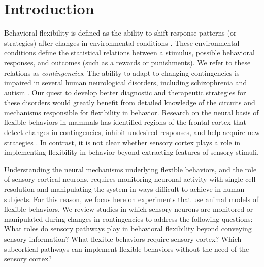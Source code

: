\section{Introduction}
Behavioral flexibility is defined as the ability to shift response patterns (or strategies) after changes in environmental conditions \citep{Ragozzino2007}. These environmental conditions define the statistical relations between a stimulus, possible behavioral responses, and outcomes (such as a rewards or punishments). We refer to these relations as \emph{contingencies}. 
%
The ability to adapt to changing contingencies is impaired in several human neurological disorders, including schizophrenia \citep{Goldberg1988,Morice1990} and autism \citep{Hill2004}. Our quest to develop better diagnostic and therapeutic strategies for these disorders would greatly benefit from detailed knowledge of the circuits and mechanisms responsible for flexibility in behavior.
%
Research on the neural basis of flexible behaviors in mammals has identified regions of the frontal cortex that detect changes in contingencies, inhibit undesired responses, and help acquire new strategies \citep{Dias1997,Ragozzino2007, Sotres-Bayon2010}. In contrast, it is not clear whether sensory cortex plays a role in implementing flexibility in behavior beyond extracting features of sensory stimuli. 

Understanding the neural mechanisms underlying flexible behaviors, and the role of sensory cortical neurons, requires monitoring neuronal activity with single cell resolution and manipulating the system in ways difficult to achieve in human subjects. For this reason, we focus here on experiments that use animal models of flexible behaviors.
%
We review studies in which sensory neurons are monitored or manipulated during changes in contingencies to address the following questions: What roles do sensory pathways play in behavioral flexibility beyond conveying sensory information? What flexible behaviors require sensory cortex? Which subcortical pathways can implement flexible behaviors without the need of the sensory cortex?

